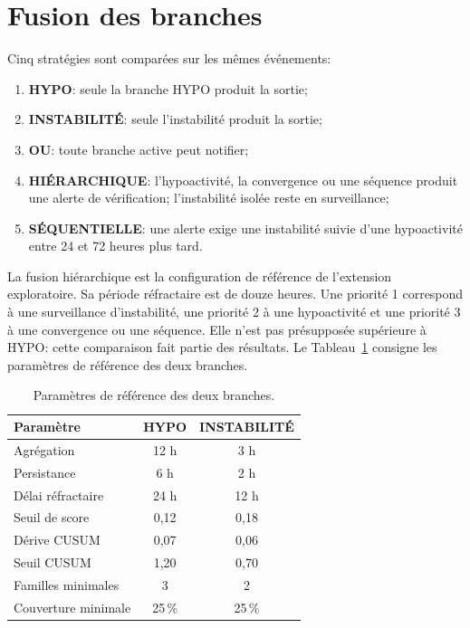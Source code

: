 \section{Fusion des branches}

Cinq stratégies sont comparées sur les mêmes événements:
\begin{enumerate}
  \item \textbf{HYPO}: seule la branche HYPO produit la sortie;
  \item \textbf{INSTABILITÉ}: seule l'instabilité produit la sortie;
  \item \textbf{OU}: toute branche active peut notifier;
  \item \textbf{HIÉRARCHIQUE}: l'hypoactivité, la convergence ou une séquence produit une
  alerte de vérification; l'instabilité isolée reste en surveillance;
  \item \textbf{SÉQUENTIELLE}: une alerte exige une instabilité suivie d'une hypoactivité
  entre 24 et 72 heures plus tard.
\end{enumerate}
La fusion hiérarchique est la configuration de référence de l'extension exploratoire. Sa
période réfractaire est de douze heures. Une priorité 1 correspond à une surveillance
d'instabilité, une priorité 2 à une hypoactivité et une priorité 3 à une convergence ou une
séquence. Elle n'est pas présupposée supérieure à HYPO: cette comparaison fait partie des
résultats. Le Tableau~\ref{tab:config_finale} consigne les paramètres de référence des deux
branches.

\begin{table}[H]
  \centering
  \caption{Paramètres de référence des deux branches.}
  \label{tab:config_finale}
  \small
  \begin{tabular}{lcc}
    \toprule
    Paramètre & HYPO & INSTABILITÉ \\
    \midrule
    Agrégation & 12 h & 3 h \\
    Persistance & 6 h & 2 h \\
    Délai réfractaire & 24 h & 12 h \\
    Seuil de score & 0,12 & 0,18 \\
    Dérive CUSUM & 0,07 & 0,06 \\
    Seuil CUSUM & 1,20 & 0,70 \\
    Familles minimales & 3 & 2 \\
    Couverture minimale & 25\,\% & 25\,\% \\
    \bottomrule
  \end{tabular}
\end{table}

